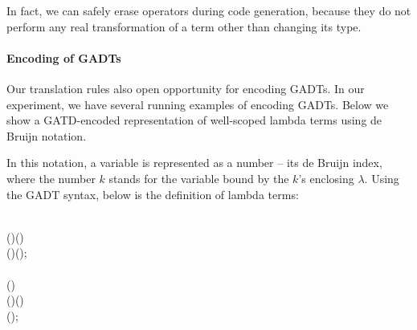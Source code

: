 In fact, we can safely erase \cast operators during code generation, because they do not perform any real transformation of a term other than changing its type.

\paragraph{Encoding of GADTs}

Our translation rules also open opportunity for encoding GADTs. In our
experiment, we have several running examples of encoding GADTs. Below
we show a GATD-encoded representation of well-scoped lambda terms
using de Bruijn notation.

In this notation, a variable is represented as a number -- its de
Bruijn index, where the number $k$ stands for the variable bound by
the $k$'s enclosing $\lambda$. Using the GADT syntax, below is the
definition of lambda terms:
\begin{hscode}\SaveRestoreHook
{}%
%
%
%
%
%
\>[3]{}\;\mathbin{:}\to \star\mathrel{=}{}\<[E]%
\\
\>[3]{}\<[8]%
\>[8]{}\mathbin{:}(\mathbin{:})\to {}\;(\;){}\<[E]%
\\
\>[3]{}\<[5]%
\>[5]{}\mid {}\<[5E]%
\>[8]{}\mathbin{:}(\mathbin{:})\to {}\;\to {}\;(\;);{}\<[E]%
\\[\blanklineskip]%
\>[3]{}\;\mathbin{:}\to \star\mathrel{=}{}\<[E]%
\\
\>[3]{}\<[8]%
\>[8]{}\mathbin{:}(\mathbin{:})\to {}\;\to {}\;\<[E]%
\\
\>[3]{}\<[5]%
\>[5]{}\mid {}\<[5E]%
\>[8]{}\mathbin{:}(\mathbin{:})\to {}\;(\;)\to {}\;\<[E]%
\\
\>[3]{}\<[5]%
\>[5]{}\mid {}\<[5E]%
\>[8]{}\mathbin{:}(\mathbin{:})\to {}\;\to {}\;\to {}\;;{}\<[E]%
\ColumnHook
\end{hscode}\resethooks
